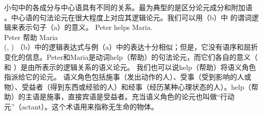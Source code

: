 小句中的各成分与中心语具有不同的关系。最为典型的是区分论元成分和附加语
。中心语的句法论元在很大程度上对应其逻辑论元。我们可以用（b）中
的谓词逻辑来表示句子（a）的意义。
\eal
\ex 
\gll Peter helps Maria.\\
     Peter 帮助 Maria\\
\ex {}(, )
\zl
（b）中的逻辑表达式与例（a）中的表达十分相似；但是，它没有语序和屈折变化的信息。Peter和Maria是动词help（帮助）的句法论元，而它们各自的意义（ 和 ）是由所表示的逻辑关系的语义论元。
我们也可以说help（帮助）将语义角色指派给它的论元。
语义角色包括施事（发出动作的人）、受事（受到影响的人或物）、受益者（得到东西或经验的人）和经事（经历某种心理状态的人）。help（帮助）的主语是施事，直接宾语是受益者。充当语义角色的论元也叫做“行动元”（actant）。这个术语用来指称无生命的物体。

